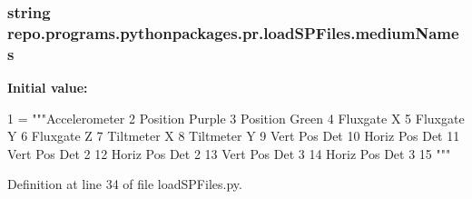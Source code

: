 \hypertarget{namespacerepo_1_1programs_1_1pythonpackages_1_1pr_1_1loadSPFiles_af4aa2bb0015793d7b7e493e4aa4f4b8c}{
\subsubsection[{medium\-Names}]{\setlength{\rightskip}{0pt plus 5cm}string repo.\-programs.\-pythonpackages.\-pr.\-load\-S\-P\-Files.\-medium\-Names}}\label{namespacerepo_1_1programs_1_1pythonpackages_1_1pr_1_1loadSPFiles_af4aa2bb0015793d7b7e493e4aa4f4b8c}
{\bfseries Initial value\-:}
\begin{DoxyCode}
1 = \textcolor{stringliteral}{"""Accelerometer}
2 \textcolor{stringliteral}{Position Purple}
3 \textcolor{stringliteral}{Position Green}
4 \textcolor{stringliteral}{Fluxgate X}
5 \textcolor{stringliteral}{Fluxgate Y}
6 \textcolor{stringliteral}{Fluxgate Z}
7 \textcolor{stringliteral}{Tiltmeter X}
8 \textcolor{stringliteral}{Tiltmeter Y}
9 \textcolor{stringliteral}{Vert Pos Det}
10 \textcolor{stringliteral}{Horiz Pos Det}
11 \textcolor{stringliteral}{Vert Pos Det 2}
12 \textcolor{stringliteral}{Horiz Pos Det 2}
13 \textcolor{stringliteral}{Vert Pos Det 3}
14 \textcolor{stringliteral}{Horiz Pos Det 3}
15 \textcolor{stringliteral}{"""}
\end{DoxyCode}


Definition at line 34 of file load\-S\-P\-Files.\-py.

